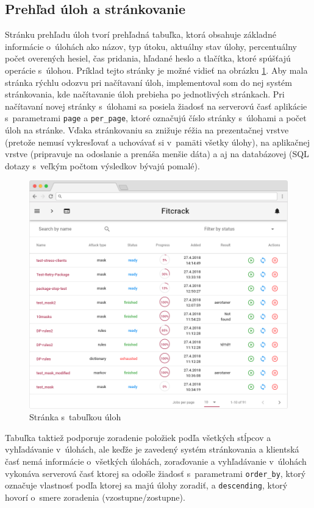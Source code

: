 \documentclass[slovak]{fitthesis}
\begin{document}
\subsection{Prehľad úloh a stránkovanie}
Stránku prehľadu úloh tvorí prehľadná tabuľka, ktorá obsahuje základné informácie o~úlohách ako názov, typ útoku, aktuálny stav úlohy, percentuálny počet overených hesiel, čas pridania, hľadané heslo a tlačítka, ktoré spúšťajú operácie s~úlohou. Príklad tejto stránky je možné vidieť na obrázku \ref{fig:jobsPage}. Aby mala stránka rýchlu odozvu pri načítavaní úloh, implementoval som do nej systém stránkovania, kde načítavanie úloh prebieha po jednotlivých stránkach. Pri načítavaní novej stránky s~úlohami sa posiela žiadosť na serverovú časť aplikácie s~parametrami \texttt{page} a \texttt{per\_page}, ktoré označujú číslo stránky s~úlohami a počet úloh na stránke. Vďaka stránkovaniu sa znižuje réžia na prezentačnej vrstve (pretože nemusí vykresľovať a uchovávať si v~pamäti všetky úlohy), na aplikačnej vrstve (pripravuje na odoslanie a prenáša menšie dáta) a aj na databázovej (SQL dotazy s~veľkým počtom výsledkov bývajú pomalé).
\begin{figure}[h]
    \centering
    \includegraphics[scale=0.46]{obrazky/jobsFrame2.PNG}
    \caption{Stránka s~tabuľkou úloh}
    \label{fig:jobsPage}
\end{figure}
\noindent
Tabuľka taktiež podporuje zoradenie položiek podľa všetkých stĺpcov a vyhľadávanie v~úlohách, ale keďže je zavedený systém stránkovania a klientská časť nemá informácie o~všetkých úlohách, zoraďovanie a vyhľadávanie v~úlohách vykonáva serverová časť ktorej sa odošle žiadosť s~parametrami \texttt{order\_by}, ktorý označuje vlastnosť podľa ktorej sa majú úlohy zoradiť, a \texttt{descending}, ktorý hovorí o~smere zoradenia (vzostupne/zostupne).
\end{document}
